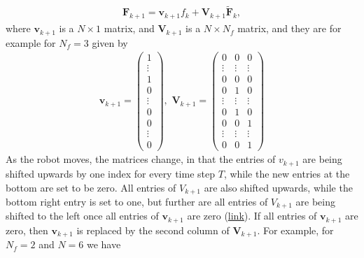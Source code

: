 \begin{align}
	\bm{F}_{k+1} = \bm{v}_{k+1}f_k + \bm{V}_{k+1}\tilde{\bm{F}}_k,
	\label{eq:312_feet}
\end{align}
where $\bm{v}_{k+1}$ is a $N\times1$ matrix, and $\bm{V}_{k+1}$ is a $N\times N_f$ matrix, and they are for example for $N_f = 3$ given by
\begin{align}
	\bm{v}_{k+1} = \begin{pmatrix}
	1 \\ 
	\vdots \\
	1 \\
	0 \\
	\vdots \\
	0 \\
	0 \\
	\vdots \\
	0
	\end{pmatrix},\,\, 
	\bm{V}_{k+1} = \begin{pmatrix}
	0 & 0 & 0\\
	\vdots & \vdots & \vdots \\
	0 & 0 & 0 \\
	0 & 1 & 0 \\
	\vdots & \vdots & \vdots \\
	0 & 1 & 0 \\
	0 & 0 & 1 \\
	\vdots & \vdots & \vdots \\
	0 & 0 & 1
	\end{pmatrix}
\end{align}
As the robot moves, the matrices change, in that the entries of $v_{k+1}$ are being shifted upwards by one index for every time step $T$, while the new entries at the bottom are set to be zero. All entries of $V_{k+1}$ are also shifted upwards, while the bottom right entry is set to one, but further are all entries of $V_{k+1}$ are being shifted to the left once all entries of $\bm{v}_{k+1}$ are zero (\href{https://github.com/mhubii/nmpc_pattern_generator/blob/5a213044c927dc6aac9f7e32ce1e5fb472cd67bb/libs/pattern_generator/src/base_generator.cpp#L740}{\underline{link}}). If all entries of $\bm{v}_{k+1}$ are zero, then $\bm{v}_{k+1}$ is replaced by the second column of $\bm{V}_{k+1}$. For example, for $N_f = 2$ and $N=6$  we have
